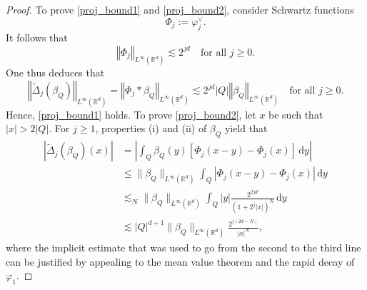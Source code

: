 \documentclass[a4paper, leqno, 10pt]{amsart}
\numberwithin{equation}{section}
\newcommand{\dd}{\mathrm{d}}
\newcommand{\R}{\mathbb{R}}
\newcommand{\norm}[1]{\left\Vert#1\right\Vert}
\newcommand{\abs}[1]{\left|#1\right|}
\begin{document}
\begin{proof}
To prove \eqref{proj_bound1} and \eqref{proj_bound2}, consider Schwartz functions 
\[
\Phi_j:=\varphi_j^\vee.
\]
It follows that 
\[
\norm{ \Phi_j }_{L^{\infty} (\R^d)} \lesssim 2^{jd} \quad \text{for all } j \geq 0.
\]
One thus deduces that
\[
\norm{ \widetilde{\Delta}_j (\beta_Q) }_{L^{\infty} (\R^d)} = \norm{ \Phi_j \ast \beta_Q }_{L^{\infty} (\R^d)}  \lesssim 2^{jd} | Q | \norm{ \beta_Q }_{L^{\infty} (\R^d)} \quad  \text{for all } j \geq 0.
\]
Hence, \eqref{proj_bound1} holds. To prove \eqref{proj_bound2}, let $x$ be such that $|x| > 2\abs{Q}$. For $j \geq 1$, properties (i) and (ii) of $\beta_Q$ yield that
\begin{align*}
| \widetilde{\Delta}_j (\beta_Q) (x) | &= \left| \int_Q \beta_Q (y) \left[ \Phi_j (x-y) - \Phi_j (x) \right] \, \dd y \right| \\
& \leq \| \beta_Q \|_{L^{\infty} (\R^d)} \int_Q  \left| \Phi_j (x-y) - \Phi_j (x) \right| \, \dd y \\
& \lesssim_N \| \beta_Q \|_{L^{\infty} (\R^d)} \int_{Q} |y| \frac{ 2^{2jd}} {(1 + 2^j |x| )^N} \, \dd y \\
& \lesssim | Q |^{d+1} \| \beta_Q \|_{L^{\infty} (\R^d)} \frac{ 2^{j(2d-N)}} {  |x|^N } ,
\end{align*}
where the implicit estimate that was used to go from the second to the third line can be justified by appealing to the mean value theorem and the rapid decay of $\varphi_1$. 
	

\end{proof}
\end{document}
